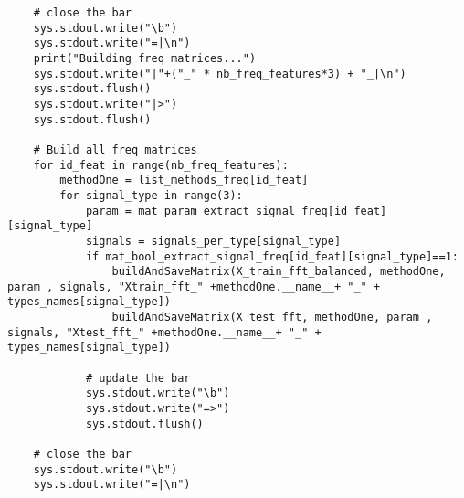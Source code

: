 \documentclass{article}
\begin{document}
\begin{lstlisting}
    # close the bar
    sys.stdout.write("\b")
    sys.stdout.write("=|\n")
    print("Building freq matrices...")
    sys.stdout.write("|"+("_" * nb_freq_features*3) + "_|\n")
    sys.stdout.flush()
    sys.stdout.write("|>")
    sys.stdout.flush()
            
    # Build all freq matrices
    for id_feat in range(nb_freq_features):
        methodOne = list_methods_freq[id_feat]
        for signal_type in range(3):
            param = mat_param_extract_signal_freq[id_feat][signal_type]
            signals = signals_per_type[signal_type]
            if mat_bool_extract_signal_freq[id_feat][signal_type]==1:
                buildAndSaveMatrix(X_train_fft_balanced, methodOne, param , signals, "Xtrain_fft_" +methodOne.__name__+ "_" + types_names[signal_type])
                buildAndSaveMatrix(X_test_fft, methodOne, param , signals, "Xtest_fft_" +methodOne.__name__+ "_" + types_names[signal_type])
                
            # update the bar
            sys.stdout.write("\b")
            sys.stdout.write("=>")
            sys.stdout.flush()  
    
    # close the bar
    sys.stdout.write("\b")
    sys.stdout.write("=|\n")
\end{lstlisting}
\end{document}
